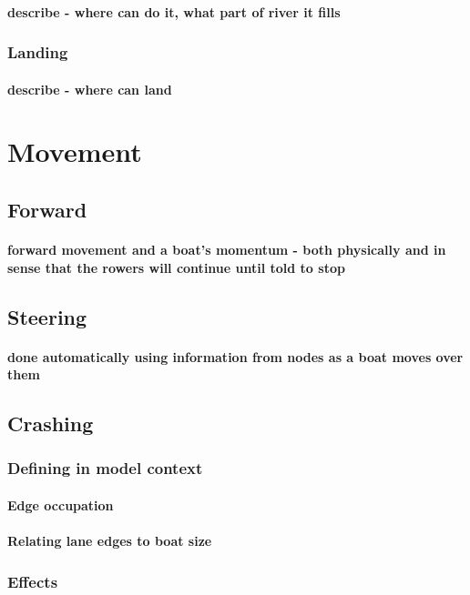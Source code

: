         \paragraph{describe - where can do it, what part of river it fills}
      \subsubsection{Landing}
        \paragraph{describe - where can land}
    
  \section{Movement}
    \subsection{Forward}
      \paragraph{forward movement and a boat's momentum - both physically and in sense that the rowers will continue until told to stop}
    \subsection{Steering}
      \paragraph{done automatically using information from nodes as a boat moves over them}
    \subsection{Crashing}
      \subsubsection{Defining in model context}
        \paragraph{Edge occupation}
        \paragraph{Relating lane edges to boat size}
      \subsubsection{Effects}
